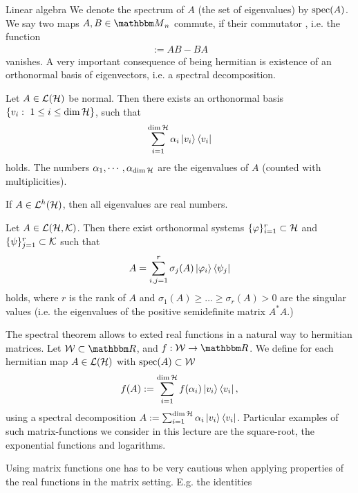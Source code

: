 \begin{section}{Linear algebra}
  We denote the spectrum of $A$ (the set of eigenvalues) by $\mathrm{spec}(A)$. 
We say two maps $A,B \in \bbmM_n$ commute, if their commutator , i.e. the function
\begin{align}
 [A,B] := AB -BA 
\end{align}
vanishes. A very important consequence of being hermitian is existence of an orthonormal basis of eigenvectors, i.e. a spectral decomposition. 
\begin{theorem} 
 Let $A \in {\mathcal L}({\mathcal H})$ be normal. Then there exists an orthonormal basis $\{v_i: \ 1 \leq i \leq \dim {\mathcal H} \}$, such that 
 \begin{align}
  \sum_{i = 1}^{\dim {\mathcal H}} \alpha_i \ket{v_i}\bra{v_i}
 \end{align}
 holds. The numbers $\alpha_1,\cdots, \alpha_{\dim {\mathcal H}}$ are the eigenvalues of $A$ (counted with multiplicities).
 \end{theorem}
 If $A \in {\mathcal L}^h({\mathcal H})$, then all eigenvalues are real numbers. 
 \begin{theorem} \label{thm:svd}
 Let $A \in {\mathcal L}({\mathcal H}, {\mathcal K})$. Then there exist orthonormal systems $\{\varphi\}_{i=1}^r \subset {\mathcal H}$ and $\{\psi\}_{j=1}^r \subset {\mathcal K}$ such that 
 \begin{align}
   A = \sum_{i,j=1}^r \sigma_j(A) \ket{\varphi_i}\bra{\psi_j}
 \end{align}
 holds, where $r$ is the rank of $A$ and $\sigma_1(A) \geq \dots \geq \sigma_r(A) > 0$ are the singular values (i.e. the eigenvalues of the positive semidefinite matrix $A^\ast A$.)
 \end{theorem}
  The spectral theorem allows to exted real functions in a natural way to hermitian matrices. Let $\cW \subset \bbmR$, and
 $f: \cW \rightarrow \bbmR$. We define for each hermitian map $A \in {\mathcal L}({\mathcal H})$ with $\mathrm{spec}(A) \subset {\mathcal W}$
 \begin{align}
  f(A) := \sum_{i=1}^{\dim {\mathcal H}} f(\alpha_i) \ket{v_i} \bra{v_i},
 \end{align}
 using a spectral decomposition $A := \sum_{i = 1}^{\dim {\mathcal H}} \alpha_i \ket{v_i} \bra{v_i}$. Particular examples of such matrix-functions we consider in this lecture are 
 the square-root, the exponential functions and logarithms.
 \begin{remark}
  Using matrix functions one has to be very cautious when applying properties of the real functions in the matrix setting. E.g. the identities
  \begin{align}

\end{align}
\end{remark}
\end{section}
